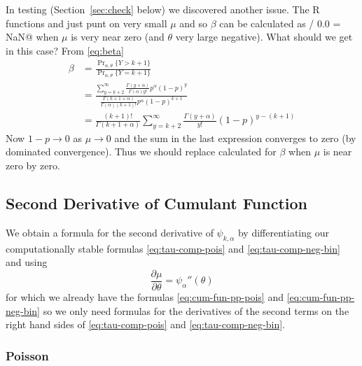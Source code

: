 \documentclass[11pt]{article}
\newcommand{\Prsub}[1]{\Pr\nolimits_{#1}}
\begin{document}
In testing (Section~\ref{sec:check} below) we discovered another
issue.  The R functions \verb@pnbinom@ and \verb@dnbinom@ just punt
on very small $\mu$ and so $\beta$ can be calculated as  / 0.0 = NaN@
when $\mu$ is very near zero (and $\theta$ very large negative).
What should we get in this case?  From \eqref{eq:beta}
\begin{align*}
   \beta
   & =
   \frac{\Prsub{\alpha, \theta}\{Y > k + 1 \}}
   {\Prsub{\alpha, \theta}\{Y = k + 1 \}}
   \\
   & =
   \frac{
   \sum_{y = k + 2}^\infty
   \frac{\Gamma(y + \alpha)}{\Gamma(\alpha) y !} p^\alpha (1 - p)^y}
   {\frac{\Gamma(k + 1 + \alpha)}{\Gamma(\alpha) (k + 1) !}
   p^\alpha (1 - p)^{k + 1}}
   \\
   & =
   \frac{(k + 1) !}{\Gamma(k + 1 + \alpha)}
   \sum_{y = k + 2}^\infty
   \frac{\Gamma(y + \alpha)}{y !} (1 - p)^{y - (k + 1)}
\end{align*}
Now $1 - p \to 0$ as $\mu \to 0$ and the sum in the last expression
converges to zero (by dominated convergence).
Thus we should replace \verb@NaN@ calculated for $\beta$ when $\mu$ is
near zero by zero.

\subsection{Second Derivative of Cumulant Function}

We obtain a formula for the second derivative of $\psi_{k, \alpha}$
by differentiating our computationally stable formulas
\eqref{eq:tau-comp-pois} and \eqref{eq:tau-comp-neg-bin} and using
$$
   \frac{\partial \mu}{\partial \theta} = \psi_\alpha''(\theta)
$$
for which we already have the formulas \eqref{eq:cum-fun-pp-pois}
and \eqref{eq:cum-fun-pp-neg-bin} so we only need formulas for the derivatives
of the second terms on the right hand sides
of \eqref{eq:tau-comp-pois} and \eqref{eq:tau-comp-neg-bin}.

\subsubsection{Poisson}
\end{document}
